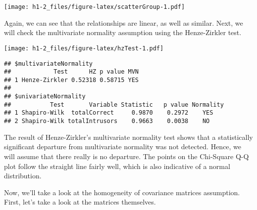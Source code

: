 \documentclass[12pt,]{article}
\newenvironment{Shaded}{\begin{snugshade}}{\end{snugshade}}
\newcommand{\DataTypeTok}[1]{\textcolor[rgb]{0.13,0.29,0.53}{#1}}
\newcommand{\KeywordTok}[1]{\textcolor[rgb]{0.13,0.29,0.53}{\textbf{#1}}}
\newcommand{\NormalTok}[1]{#1}
\newcommand{\OperatorTok}[1]{\textcolor[rgb]{0.81,0.36,0.00}{\textbf{#1}}}
\newcommand{\StringTok}[1]{\textcolor[rgb]{0.31,0.60,0.02}{#1}}
\begin{document}
\texttt{[image: h1-2\_files/figure-latex/scatterGroup-1.pdf]}

Again, we can see that the relationships are linear, as well as similar.
Next, we will check the multivariate normality assumption using the
Henze-Zirkler test.

\begin{Shaded}
\end{Shaded}

\texttt{[image: h1-2\_files/figure-latex/hzTest-1.pdf]}

\begin{verbatim}
## $multivariateNormality
##            Test      HZ p value MVN
## 1 Henze-Zirkler 0.52318 0.58715 YES
## 
## $univariateNormality
##           Test       Variable Statistic   p value Normality
## 1 Shapiro-Wilk  totalCorrect     0.9870    0.2972    YES   
## 2 Shapiro-Wilk totalIntrusors    0.9663    0.0038    NO
\end{verbatim}

The result of Henze-Zirkler's multivariate normality test shows that a
statistically significant departure from multivariate normality was not
detected. Hence, we will assume that there really is no departure. The
points on the Chi-Square Q-Q plot follow the straight line fairly well,
which is also indicative of a normal distribution.

Now, we'll take a look at the homogeneity of covariance matrices
assumption. First, let's take a look at the matrices themselves.

\begin{Shaded}
\end{Shaded}
\end{document}
